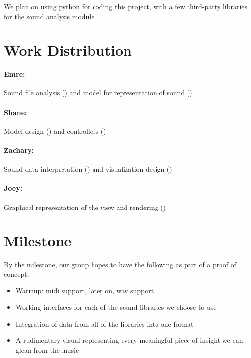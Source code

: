 \documentclass{article}
\begin{document}
We plan on using python for coding this project, with a few third-party libraries for the sound analysis module.

\section{Work Distribution}

\paragraph{Emre:} Sound file analysis () and model for representation of sound ()
\vspace{-0.5cm}
\paragraph{Shane:} Model design () and controllers ()
\vspace{-0.5cm}
\paragraph{Zachary:} Sound data interpretation () and visualization design ()
\vspace{-0.5cm}
\paragraph{Joey:} Graphical representation of the view and rendering ()

\section{Milestone}

By the milestone, our group hopes to have the following as part of a proof of concept:

\begin{itemize}
	\item Warmup: midi support, later on, wav support
	\item Working interfaces for each of the sound libraries we choose to use
	\item Integration of data from all of the libraries into one format
	\item A rudimentary visual representing every meaningful piece of insight we can glean from the music
\end{itemize}
\end{document}
